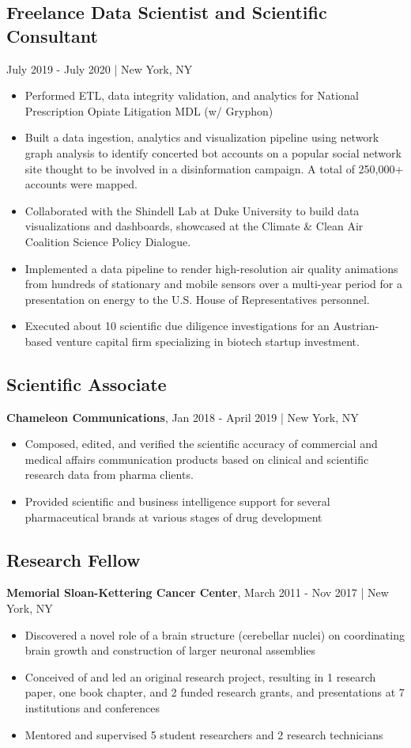 \documentclass[11pt]{article}
\newenvironment{myitemize}
{ \begin{itemize}
	\setlength{\itemsep}{0pt}
	\setlength{\parskip}{0pt}
	\setlength{\parsep}{0pt}     }
{ \end{itemize}                  }
\begin{document}
\subsection*{Freelance Data Scientist and Scientific Consultant} July 2019 - July 2020 | New York, NY
\begin{myitemize}
	\item Performed ETL, data integrity validation, and analytics for National Prescription Opiate Litigation MDL (w/ Gryphon)
	\item Built a data ingestion, analytics and visualization pipeline using network graph analysis to identify concerted bot accounts on a popular social network site thought to be involved in a disinformation campaign. A total of 250,000+ accounts were mapped.
	\item Collaborated with the Shindell Lab at Duke University to build data visualizations and dashboards, showcased at the Climate \& Clean Air Coalition Science Policy Dialogue.
	\item Implemented a data pipeline to render high-resolution air quality animations from hundreds of stationary and mobile sensors over a multi-year period for a presentation on energy to the U.S. House of Representatives personnel. 
	\item Executed about 10 scientific due diligence investigations for an Austrian-based venture capital firm specializing in biotech startup investment.
\end{myitemize}

\subsection*{Scientific Associate}
{\bfseries Chameleon Communications}, Jan 2018 - April 2019 | New York, NY
\begin{myitemize}
	\item Composed, edited, and verified the scientific accuracy of commercial and medical affairs communication products based on clinical and scientific research data from pharma clients.
	\item Provided scientific and business intelligence support for several pharmaceutical brands at various stages of drug development
\end{myitemize}

\subsection*{Research Fellow}
{\bfseries Memorial Sloan-Kettering Cancer Center}, March 2011 - Nov 2017 | New York, NY
\begin{myitemize}
	\item Discovered a novel role of a brain structure (cerebellar nuclei) on coordinating brain growth and construction of larger neuronal assemblies
	\item Conceived of and led an original research project, resulting in 1 research paper, one book chapter, and 2 funded research grants, and presentations at 7 institutions and conferences
	\item Mentored and supervised 5 student researchers and 2 research technicians
\end{myitemize}
\end{document}
